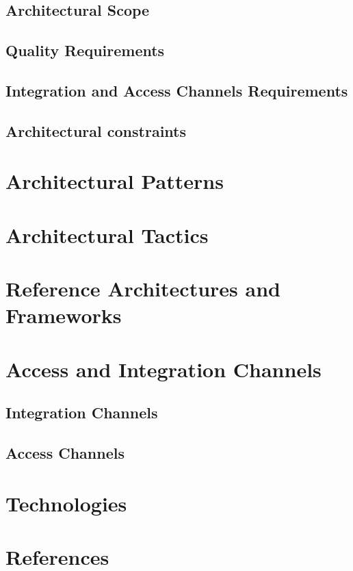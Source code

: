 \documentclass[a4paper,12pt]{article}
\begin{document}
		\subsection{Architectural Scope}
		

		\subsection{Quality Requirements}
		
			
		\subsection{Integration and Access Channels Requirements}
		
					
		\subsection{Architectural constraints}
		
	
	\section{Architectural Patterns}
	
	
	\section{Architectural Tactics}
	
	
	\section{Reference Architectures and Frameworks}
	

	\section{Access and Integration Channels}
		\subsection{Integration Channels}
		
		
		\subsection{Access Channels}
		

	\section{Technologies}
	
	
	
	\section{References}
	
	
\end{document}
